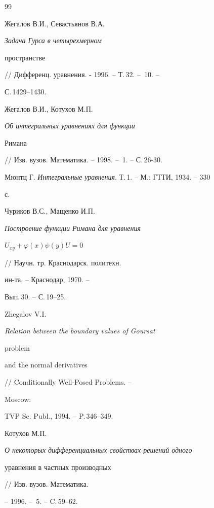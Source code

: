 \begin{thebibliography}{99}


Жегалов В.И., Севастьянов В.А. {\em Задача Гурса в четырехмерном 


пространстве} 


// Дифференц. уравнения. - 1996. -- Т.\,32. -- \No\,10. -- 


С.\,1429--1430. 




Жегалов В.И., Котухов М.П. {\em Об интегральных уравнениях для функции  


Римана} // Изв. вузов. Математика. -- 1998. -- \No\,1. -- С.\,26-30. 




Мюнтц Г. {\em Интегральные уравнения}. Т.\,1. -- М.: ГТТИ, 1934. -- 330 


с. 




Чуриков В.С., Мащенко И.П. {\em Построение функции Римана для уравнения  


$U_{xy}{+}\varphi(x)\psi(y)U{=}0$} // Научн. тр. Краснодарск. политехн. 


ин-та. -- Краснодар, 1970. -- 


Вып.\,30. -- С.\,19--25. 




Zhegalov V.I. {\em Relation between the boundary values of Goursat 


problem  


and the normal derivatives} // Conditionally Well-Posed Problems. -- 


Moscow: 


TVP Sc. Publ., 1994. -- P.\,346--349. 




Котухов М.П. {\em О некоторых дифференциальных свойствах решений одного  


уравнения в частных производных} // Изв. вузов. Математика. 


-- 1996. -- \No\,5. -- C.\,59--62. 


 


\end{thebibliography} 


 


\vskip 2cm 


 








 


\label{end} 


 


 


